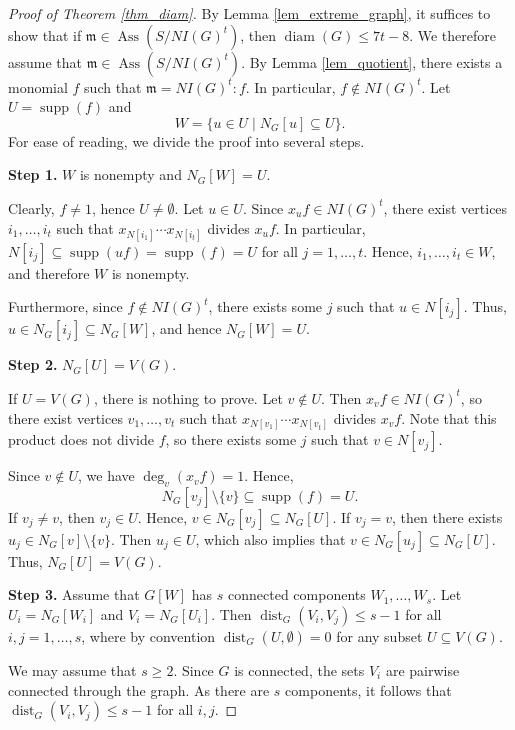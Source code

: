 \documentclass[10pt,a4paper]{amsart}
\DeclareMathOperator{\Ass}{Ass}
\DeclareMathOperator{\diam}{diam}
\DeclareMathOperator{\dist}{dist}
\newcommand{\mm}{\mathfrak m}
\DeclareMathOperator{\supp}{supp}
\begin{document}
\begin{proof}[Proof of Theorem \ref{thm_diam}]
By Lemma \ref{lem_extreme_graph}, it suffices to show that if $\mm \in \Ass(S/NI(G)^t)$, then $\diam(G) \leq 7t - 8$. We therefore assume that $\mm \in \Ass(S/NI(G)^t)$. By Lemma \ref{lem_quotient}, there exists a monomial $f$ such that $\mm = NI(G)^t : f$. In particular, $f \notin NI(G)^t$. Let $U = \supp(f)$ and 
\[
W = \{u \in U \mid N_G[u] \subseteq U\}.
\]
For ease of reading, we divide the proof into several steps.

\medskip

\noindent \textbf{Step 1.} $W$ is nonempty and $N_G[W] = U$.

Clearly, $f \neq 1$, hence $U \neq \emptyset$. Let $u \in U$. Since $x_u f \in NI(G)^t$, there exist vertices $i_1, \ldots, i_t$ such that $x_{N[i_1]} \cdots x_{N[i_t]}$ divides $x_u f$. In particular, $N[i_j] \subseteq \supp(uf) = \supp(f) = U$ for all $j = 1, \ldots, t$. Hence, $i_1, \ldots, i_t \in W$, and therefore $W$ is nonempty.

Furthermore, since $f \notin NI(G)^t$, there exists some $j$ such that $u \in N[i_j]$. Thus, $u \in N_G[i_j] \subseteq N_G[W]$, and hence $N_G[W] = U$.

\medskip

\noindent \textbf{Step 2.} $N_G[U] = V(G)$.

If $U = V(G)$, there is nothing to prove. Let $v \notin U$. Then $x_v f \in NI(G)^t$, so there exist vertices $v_1, \ldots, v_t$ such that $x_{N[v_1]} \cdots x_{N[v_t]}$ divides $x_v f$. Note that this product does not divide $f$, so there exists some $j$ such that $v \in N[v_j]$.

Since $v \notin U$, we have $\deg_v(x_v f) = 1$. Hence,
\[
N_G[v_j] \setminus \{v\} \subseteq \supp(f) = U.
\]
If $v_j \neq v$, then $v_j \in U$. Hence, $v \in N_G[v_j] \subseteq N_G[U]$. If $v_j = v$, then there exists $u_j \in N_G[v] \setminus \{v\}$. Then $u_j \in U$, which also implies that $v \in N_G[u_j] \subseteq N_G[U]$. Thus, $N_G[U] = V(G)$.

\medskip

\noindent \textbf{Step 3.} Assume that $G[W]$ has $s$ connected components $W_1, \ldots, W_s$. Let $U_i = N_G[W_i]$ and $V_i = N_G[U_i]$. Then $\dist_G(V_i, V_j) \leq s - 1$ for all $i, j = 1, \ldots, s$, where by convention $\dist_G(U, \emptyset) = 0$ for any subset $U \subseteq V(G)$.

We may assume that $s \geq 2$. Since $G$ is connected, the sets $V_i$ are pairwise connected through the graph. As there are $s$ components, it follows that $\dist_G(V_i, V_j) \leq s - 1$ for all $i, j$.


\end{proof}
\end{document}
